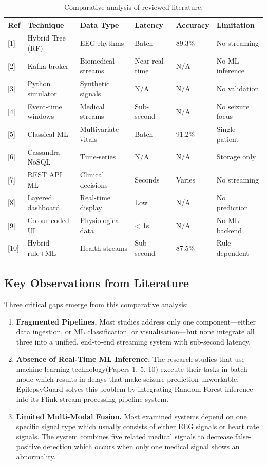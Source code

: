 \documentclass[12pt, a4paper, oneside]{report}
\begin{document}
\begin{table}[h!]
\centering
\caption{Comparative analysis of reviewed literature.}
\label{tab:litcomp}
\small
\begin{tabular}{|p{0.8cm}|p{2.5cm}|p{2.2cm}|p{2cm}|p{2cm}|p{2cm}|}
\hline
\textbf{Ref} & \textbf{Technique} & \textbf{Data Type} & \textbf{Latency} & \textbf{Accuracy} & \textbf{Limitation} \\ \hline
{[1]} & Hybrid Tree (RF) & EEG rhythms & Batch & 89.3\% & No streaming \\ \hline
{[2]} & Kafka broker & Biomedical streams & Near real-time & N/A & No ML inference \\ \hline
{[3]} & Python simulator & Synthetic signals & N/A & N/A & No validation \\ \hline
{[4]} & Event-time windows & Medical streams & Sub-second & N/A & No seizure focus \\ \hline
{[5]} & Classical ML & Multivariate vitals & Batch & 91.2\% & Single-patient \\ \hline
{[6]} & Cassandra NoSQL & Time-series & N/A & N/A & Storage only \\ \hline
{[7]} & REST API ML & Clinical decisions & Seconds & Varies & No streaming \\ \hline
{[8]} & Layered dashboard & Real-time display & Low & N/A & No prediction \\ \hline
{[9]} & Colour-coded UI & Physiological data & < 1s & N/A & No ML backend \\ \hline
{[10]} & Hybrid rule+ML & Health streams & Sub-second & 87.5\% & Rule-dependent \\ \hline
\end{tabular}
\end{table}

\subsection{Key Observations from Literature}
Three critical gaps emerge from this comparative analysis:

\begin{enumerate}
    \item \textbf{Fragmented Pipelines.} Most studies address only one component---either data ingestion, or ML classification, or visualisation---but none integrate all three into a unified, end-to-end streaming system with sub-second latency.
    \item \textbf{Absence of Real-Time ML Inference.} The research studies that use machine learning technology(Papers 1, 5, 10) execute their tasks in batch mode which results in delays that make seizure prediction unworkable. EpilepsyGuard solves this problem by integrating Random Forest inference into its Flink stream-processing pipeline system.
    \item \textbf{Limited Multi-Modal Fusion.} Most examined systems depend on one specific signal type which usually consists of either EEG signals or heart rate signals. The system combines five related medical signals to decrease false-positive detection which occurs when only one medical signal shows an abnormality.
\end{enumerate}
\end{document}
